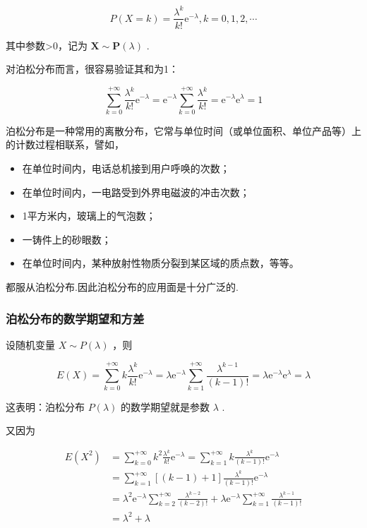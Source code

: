 \begin{equation}
P(X=k)=\frac{\lambda^{k}}{k !} \mathrm{e}^{-\lambda}, k=0,1,2, \cdots \label{eq:2.4.3}
\end{equation}

其中参数>0，记为 $\mathbf{X} \sim \mathbf{P}(\lambda)$ .

对泊松分布而言，很容易验证其和为1：

\[
\sum_{k=0}^{+\infty} \frac{\lambda^{k}}{k !} \mathrm{e}^{-\lambda}=\mathrm{e}^{-\lambda} \sum_{k=0}^{+\infty} \frac{\lambda^{k}}{k !}=\mathrm{e}^{-\lambda} \mathrm{e}^{\lambda}=1
\]

泊松分布是一种常用的离散分布，它常与单位时间（或单位面积、单位产品等）上的计数过程相联系，譬如，

\begin{itemize}
	\item 在单位时间内，电话总机接到用户呼唤的次数；
	\item 在单位时间内，一电路受到外界电磁波的冲击次数；
	\item 1平方米内，玻璃上的气泡数；
	\item 一铸件上的砂眼数；
	\item 在单位时间内，某种放射性物质分裂到某区域的质点数，等等。
\end{itemize}

都服从泊松分布.因此泊松分布的应用面是十分广泛的.

\subsubsection{泊松分布的数学期望和方差}

设随机变量 $X \sim P(\lambda)$ ，则

\[
E(X)=\sum_{k=0}^{+\infty} k \frac{\lambda^{k}}{k !} \mathrm{e}^{-\lambda}=\lambda \mathrm{e}^{-\lambda} \sum_{k=1}^{+\infty} \frac{\lambda^{k-1}}{(k-1) !}=\lambda \mathrm{e}^{-\lambda} \mathrm{e}^{\lambda}=\lambda
\]

这表明：泊松分布 $P(\lambda)$ 的数学期望就是参数 $\lambda$ .

又因为

\[
\begin{aligned} E\left(X^{2}\right) &=\sum_{k=0}^{+\infty} k^{2} \frac{\lambda^{k}}{k !} \mathrm{e}^{-\lambda}=\sum_{k=1}^{+\infty} k \frac{\lambda^{k}}{(k-1) !} \mathrm{e}^{-\lambda} \\ &=\sum_{k=1}^{+\infty}[(k-1)+1] \frac{\lambda^{k}}{(k-1) !} \mathrm{e}^{-\lambda} \\ &=\lambda^{2} \mathrm{e}^{-\lambda} \sum_{k=2}^{+\infty} \frac{\lambda^{k-2}}{(k-2) !}+\lambda \mathrm{e}^{-\lambda} \sum_{k=1}^{+\infty} \frac{\lambda^{k-1}}{(k-1) !} \\ &=\lambda^{2}+\lambda \end{aligned}
\]


